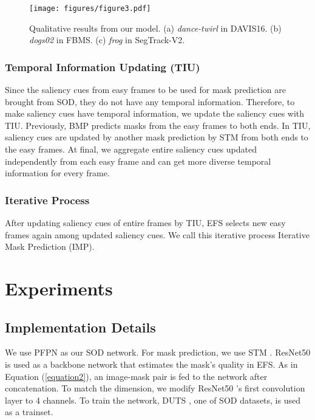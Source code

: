\documentclass[letterpaper]{article} \usepackage{aaai22}  \usepackage{times}  \usepackage{helvet}  \usepackage{courier}  \usepackage[hyphens]{url}  \usepackage{graphicx} \urlstyle{rm} \def\UrlFont{\rm}  \usepackage{natbib}  \usepackage{caption} \DeclareCaptionStyle{ruled}{labelfont=normalfont,labelsep=colon,strut=off} \frenchspacing  \setlength{\pdfpagewidth}{8.5in}  \setlength{\pdfpageheight}{11in}  \usepackage{algorithm}
\begin{document}
\begin{figure*}[t]
\texttt{[image: figures/figure3.pdf]}
\caption{Qualitative results from our model. (a) \textit{dance-twirl} in DAVIS16. (b) \textit{dogs02} in FBMS. (c) \textit{frog} in SegTrack-V2.}
\label{figure3}
\end{figure*}

\subsubsection{Temporal Information Updating (TIU)}

Since the saliency cues from easy frames to be used for mask prediction are brought from SOD, they do not have any temporal information. Therefore, to make saliency cues have temporal information, we update the saliency cues with TIU. Previously, BMP predicts masks from the easy frames to both ends. In TIU, saliency cues are updated by another mask prediction by STM  \citep{oh2019video} from both ends to the easy frames. At final, we aggregate entire saliency cues updated independently from each easy frame and can get more diverse temporal information for every frame. 

\subsubsection{Iterative Process}

After updating saliency cues of entire frames by TIU, EFS selects new easy frames again among updated saliency cues. We call this iterative process Iterative Mask Prediction (IMP).

\section{Experiments}

\subsection{Implementation Details}

We use PFPN \citep{wang2020progressive} as our SOD network. For mask prediction, we use STM \citep{oh2019video}. ResNet50 \citep{he2016deep} is used as a backbone network that estimates the mask’s quality in EFS. As in Equation (\ref{equation2}), an image-mask pair is fed to the network after concatenation. To match the dimension, we modify ResNet50 \citep{he2016deep}’s first convolution layer to 4 channels.
To train the network, DUTS \citep{wang2017learning}, one of SOD datasets, is used as a trainset. 
\end{document}
